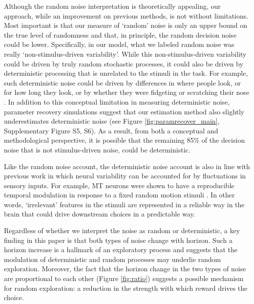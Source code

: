 \documentclass[12pt]{article}
\begin{document}
{Although the random noise interpretation is theoretically appealing, our approach, while an improvement on previous methods, is not without limitations. Most important is that our measure of `random' noise is only an upper bound on the true level of randomness and that, in principle, the random decision noise could be lower. Specifically, in our model, what we labeled random noise was really `non-stimulus-driven variability'. While this non-stimulus-driven variability could be driven by truly random stochastic processes, it could also be driven by deterministic processing that is unrelated to the stimuli in the task. For example, such deterministic noise could be driven by differences in where people look, or for how long they look, or by whether they were fidgeting or scratching their nose \citep{Musall2019}. In addition to this conceptual limitation in measuring deterministic noise, parameter recovery simulations suggest that our estimation method also slightly underestimates deterministic noise (see Figure \ref{fig:paramrecover_main}, Supplementary Figure S5, S6). As a result, from both a conceptual and methodological perspective, it is possible that the remaining 85\% of the decision noise that is not stimulus-driven noise, could be deterministic.

Like the random noise account, the deterministic noise account is also in line with previous work in which neural variability can be accounted for by fluctuations in sensory inputs. For example, MT neurons were shown to have a reproducible temporal modulation in response to a fixed random motion stimuli \citep{Bair1996}. In other words, `irrelevant' features in the stimuli are represented in a reliable way in the brain that could drive downstream choices in a predictable way. 


Regardless of whether we interpret the noise as random or deterministic, a key finding in this paper is that both types of noise change with horizon. Such a horizon increase is a hallmark of an exploratory process and suggests that the modulation of deterministic and random processes may underlie random exploration. Moreover, the fact that the horizon change in the two types of noise are proportional to each other (Figure \ref{fig:ratio}) suggests a possible mechanism for random exploration: a reduction in the strength with which reward drives the choice. 

}
\end{document}
